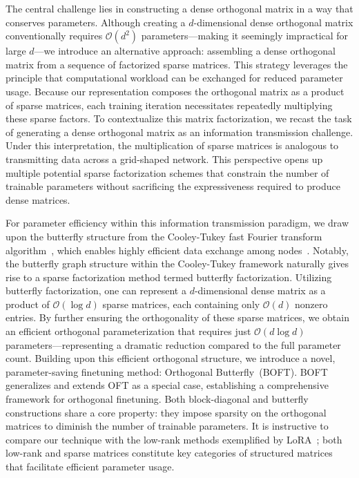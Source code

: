 The central challenge lies in constructing a dense orthogonal matrix in a way that conserves parameters. Although creating a $d$-dimensional dense orthogonal matrix conventionally requires $\mathcal{O}(d^2)$ parameters—making it seemingly impractical for large $d$—we introduce an alternative approach: assembling a dense orthogonal matrix from a sequence of factorized sparse matrices. This strategy leverages the principle that computational workload can be exchanged for reduced parameter usage. Because our representation composes the orthogonal matrix as a product of sparse matrices, each training iteration necessitates repeatedly multiplying these sparse factors. To contextualize this matrix factorization, we recast the task of generating a dense orthogonal matrix as an information transmission challenge. Under this interpretation, the multiplication of sparse matrices is analogous to transmitting data across a grid-shaped network. This perspective opens up multiple potential sparse factorization schemes that constrain the number of trainable parameters without sacrificing the expressiveness required to produce dense matrices.

For parameter efficiency within this information transmission paradigm, we draw upon the butterfly structure from the Cooley-Tukey fast Fourier transform algorithm~\cite{cooley1965algorithm}, which enables highly efficient data exchange among nodes~\cite{klasing1994broadcasting}. Notably, the butterfly graph structure within the Cooley-Tukey framework naturally gives rise to a sparse factorization method termed butterfly factorization. Utilizing butterfly factorization, one can represent a $d$-dimensional dense matrix as a product of $\mathcal{O}(\log d)$ sparse matrices, each containing only $\mathcal{O}(d)$ nonzero entries. By further ensuring the orthogonality of these sparse matrices, we obtain an efficient orthogonal parameterization that requires just $\mathcal{O}(d\log d)$ parameters—representing a dramatic reduction compared to the full parameter count. Building upon this efficient orthogonal structure, we introduce a novel, parameter-saving finetuning method: Orthogonal Butterfly~(BOFT). BOFT generalizes and extends OFT as a special case, establishing a comprehensive framework for orthogonal finetuning. Both block-diagonal and butterfly constructions share a core property: they impose sparsity on the orthogonal matrices to diminish the number of trainable parameters. It is instructive to compare our technique with the low-rank methods exemplified by LoRA~\cite{hulora2022}; both low-rank and sparse matrices constitute key categories of structured matrices~\cite{candes2011robust} that facilitate efficient parameter usage.


